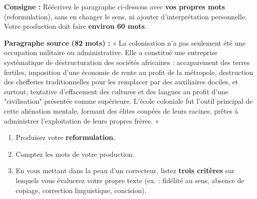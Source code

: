 \documentclass[11pt]{article}
\begin{document}
\begin{exercice}
\textbf{Consigne :} Réécrivez le paragraphe ci-dessous avec \textbf{vos propres mots} (reformulation), sans en changer le sens, ni ajouter d'interprétation personnelle. Votre production doit faire \textbf{environ 60 mots}.

\textbf{Paragraphe source (82 mots) :}
« La colonisation n'a pas seulement été une occupation militaire ou administrative. Elle a constitué une entreprise systématique de déstructuration des sociétés africaines : accaparement des terres fertiles, imposition d'une économie de rente au profit de la métropole, destruction des chefferies traditionnelles pour les remplacer par des auxiliaires dociles, et surtout, tentative d'effacement des cultures et des langues au profit d'une "civilisation" présentée comme supérieure. L'école coloniale fut l'outil principal de cette aliénation mentale, formant des élites coupées de leurs racines, prêtes à administrer l'exploitation de leurs propres frères. »

\begin{enumerate}
    \item Produisez votre \textbf{reformulation}.
    \item Comptez les mots de votre production.
    \item En vous mettant dans la peau d'un correcteur, listez \textbf{trois critères} sur lesquels vous évaluerez votre propre texte (ex. : fidélité au sens, absence de copiage, correction linguistique, concision).
\end{enumerate}
\end{exercice}
\end{document}
